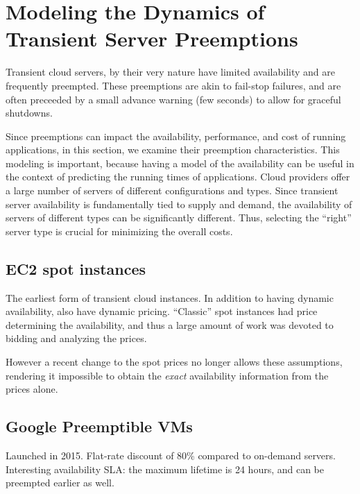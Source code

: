 \section{Modeling the Dynamics of Transient Server Preemptions}

Transient cloud servers, by their very nature have limited availability and are frequently preempted.
These preemptions are akin to fail-stop failures, and are often preceeded by a small advance warning (few seconds) to allow for graceful shutdowns.

Since preemptions can impact the availability, performance, and cost of running applications, in this section, we examine their preemption characteristics.
This modeling is important, because having a model of the availability can be useful in the context of predicting the running times of applications.
Cloud providers offer a large number of servers of different configurations and types.
Since transient server availability is fundamentally tied to supply and demand, the availability of servers of different types can be significantly different. 
Thus, selecting the ``right'' server type is crucial for minimizing the overall costs. 




\subsection{EC2 spot instances}

The earliest form of transient cloud instances.
In addition to having dynamic availability, also have dynamic pricing.
``Classic'' spot instances had price determining the availability, and thus a large amount of work was devoted to bidding and analyzing the prices.

However a recent change to the spot prices no longer allows these assumptions, rendering it impossible to obtain the \emph{exact} availability information from the prices alone.


\subsection{Google Preemptible VMs}

Launched in 2015.
Flat-rate discount of 80\% compared to on-demand servers.
Interesting availability SLA: the maximum lifetime is 24 hours, and can be preempted earlier as well.


